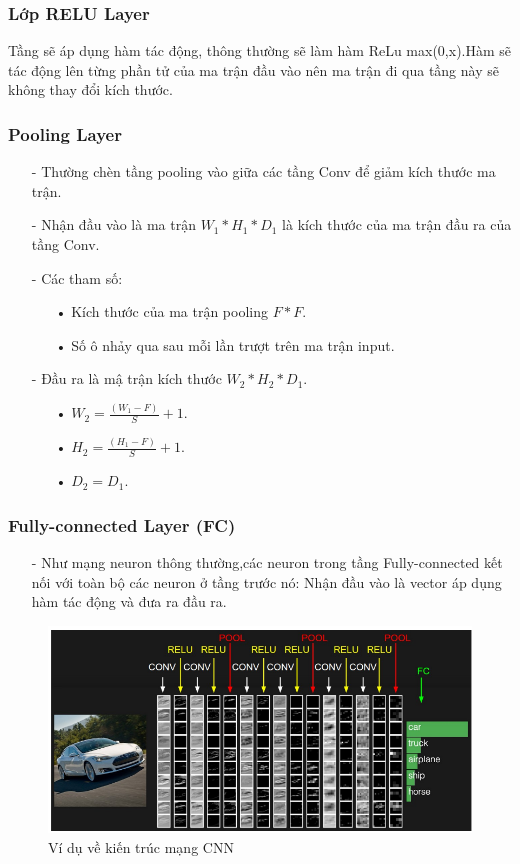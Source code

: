\documentclass[a4paper,12pt]{report}
\begin{document}
\subsubsection{Lớp RELU Layer}
Tầng sẽ áp dụng hàm tác động, thông thường sẽ làm hàm ReLu max(0,x).Hàm sẽ tác động lên từng phần tử của ma trận đầu vào nên ma trận đi qua tầng này sẽ không thay đổi kích thước.
\subsubsection{Pooling Layer}
\begin{itemize}
\item[-] Thường chèn tầng pooling vào giữa các tầng Conv để giảm kích thước ma trận.
\item[-] Nhận đầu vào là ma trận $W_1*H_1*D_1$ là kích thước của ma trận đầu ra của tầng Conv.
\item[-] Các tham số:
\begin{itemize}
\item[•] Kích thước của ma trận pooling $F*F$.
\item[•] Số ô nhảy qua sau mỗi lần trượt trên ma trận input.
\end{itemize}
\item[-] Đầu ra là mậ trận kích thước $W_2*H_2*D_1$.
\begin{itemize}
\item[•] $W_2 = \frac{(W_1 - F)}{S} + 1$.
\item[•] $H_2 = \frac{(H_1 - F)}{S} + 1$.
\item[•] $D_2 = D_1$.
\end{itemize}
\end{itemize}
\subsubsection{Fully-connected Layer (FC)}
\begin{itemize}
\item[-] Như mạng neuron thông thường,các neuron trong tầng Fully-connected kết nối với toàn bộ các neuron ở tầng trước nó: Nhận đầu vào là vector áp dụng hàm tác động và đưa ra đầu ra.
\end{itemize}
\begin{figure}[h]
\begin{center}
\includegraphics[width =0.8 \textwidth]{ConvNetArchitecture.png}
\end{center}
\caption{Ví dụ về kiến trúc mạng CNN}
\end{figure}
\end{document}
